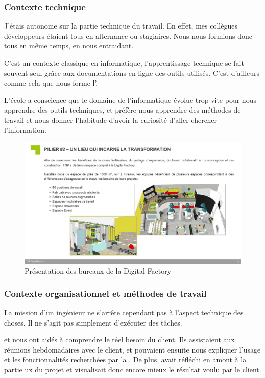 \subsubsection{Contexte technique}

J'étais autonome sur la partie technique du travail. En effet, mes collègues développeurs étaient tous en alternance ou stagiaires. Nous nous formions donc tous en même temps, en nous entraidant.

C'est un contexte classique en informatique, l'apprentissage technique se fait souvent seul grâce aux documentations en ligne des outils utilisés. C'est d'ailleurs comme cela que nous forme l'\epita.

L'école a conscience que le domaine de l'informatique évolue trop vite pour nous apprendre des outils techniques, et préfère nous apprendre des méthodes de travail et nous donner l'habitude d'avoir la curiosité d'aller chercher l'information.

\begin{figure}[H]
    \centering
    \includegraphics[width=1\linewidth]{img/digital_factory_lieu.png}
    \caption{Présentation des bureaux de la Digital Factory}
\end{figure}

\subsubsection{Contexte organisationnel et méthodes de travail}

La mission d'un ingénieur ne s'arrête cependant pas à l'aspect technique des choses. Il ne s'agit pas simplement d'exécuter des tâches.

\damien et \stefan nous ont aidés à comprendre le réel besoin du client. Ils assistaient aux réunions hebdomadaires avec le client, et pouvaient ensuite nous expliquer l'usage et les fonctionnalités recherchées par la \sncf. De plus, \stefan avait réfléchi en amont à la partie \gls{ux} du projet et visualisait donc encore mieux le résultat voulu par le client.

